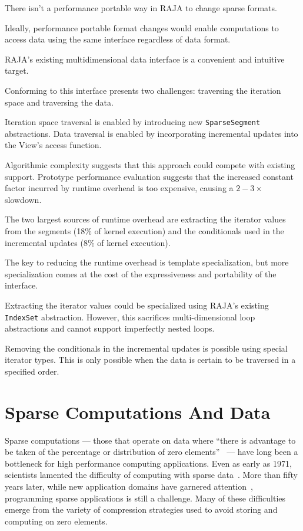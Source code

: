 There isn't a performance portable way in RAJA to change sparse formats.

Ideally, performance portable format changes would enable computations to access data using the same interface regardless of data format.

RAJA's existing multidimensional data interface is a convenient and intuitive target.

Conforming to this interface presents two challenges: traversing the iteration space and traversing the data.

Iteration space traversal is enabled by introducing new \verb.SparseSegment. abstractions.
Data traversal is enabled by incorporating incremental updates into the View's access function.

Algorithmic complexity suggests that this approach could compete with existing support.
Prototype performance evaluation suggests that the increased constant factor incurred by runtime overhead is too expensive, causing a $2-3\times$ slowdown.

The two largest sources of runtime overhead are extracting the iterator values from the segments (18\% of kernel execution) and the conditionals used in the incremental updates (8\% of kernel execution).

The key to reducing the runtime overhead is template specialization, but more specialization comes at the cost of the expressiveness and portability of the interface.

Extracting the iterator values could be specialized using RAJA's existing \verb.IndexSet. abstraction.
However, this sacrifices multi-dimensional loop abstractions and cannot support imperfectly nested loops.

Removing the conditionals in the incremental updates is possible using special iterator types.
This is only possible when the data is certain to be traversed in a specified order.


\section{Sparse Computations And Data}


Sparse computations --- those that operate on data where ``there is advantage to be taken of the percentage or distribution of zero elements''~\cite{duff1977survey} --- have long been a bottleneck for high performance computing applications. 
Even as early as 1971, scientists lamented the difficulty of computing with sparse data~\cite{willoughby1971sparse}.
More than fifty years later, while new application domains have garnered attention~\cite{he2016fusing,zhao2018bridging,zhu2019sparse}, programming sparse applications is still a challenge.
Many of these difficulties emerge from the variety of compression strategies used to avoid storing and computing on zero elements.


